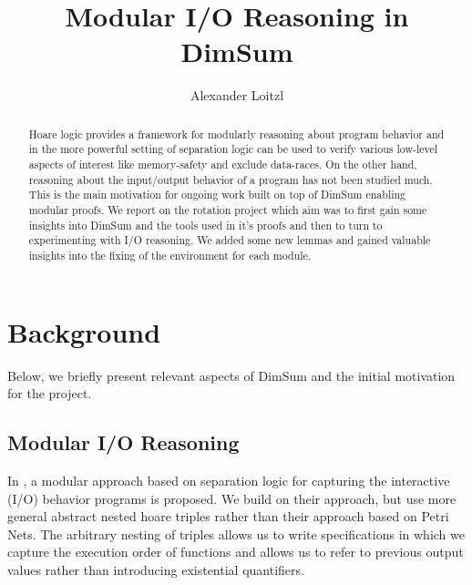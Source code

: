 \documentclass[runningheads, orivec]{llncs}
\begin{document}
\title{Modular I/O Reasoning in DimSum}
%
%
\author{Alexander Loitzl\Envelope{}}%
%

%
\maketitle              %
%
%

\begin{abstract}
  Hoare logic provides a framework for modularly reasoning about program behavior and in the more powerful setting of separation logic can be used to verify various low-level aspects of interest like memory-safety and exclude data-races. On the other hand, reasoning about the input/output behavior of a program has not been studied much.
  This is the main motivation for ongoing work built on top of DimSum enabling modular proofs.
  We report on the rotation project which aim was to first gain some insights into DimSum and the tools used in it's proofs and then to turn to experimenting with I/O reasoning.
  We added some new lemmas and gained valuable insights into the fixing of the environment for each module.
\end{abstract}

\section{Background}
Below, we briefly present relevant aspects of DimSum\cite{dimsum} and the initial motivation for the project.
\subsection{Modular I/O Reasoning}

In \cite{io1,io2},  a modular approach based on separation logic for capturing the interactive (I/O) behavior programs is proposed. We build on their approach, but use more general abstract nested hoare triples rather than their approach based on Petri Nets. The arbitrary nesting of triples allows us to write specifications in which we capture the execution order of functions and allows us to refer to previous output values rather than introducing existential quantifiers.
\end{document}
